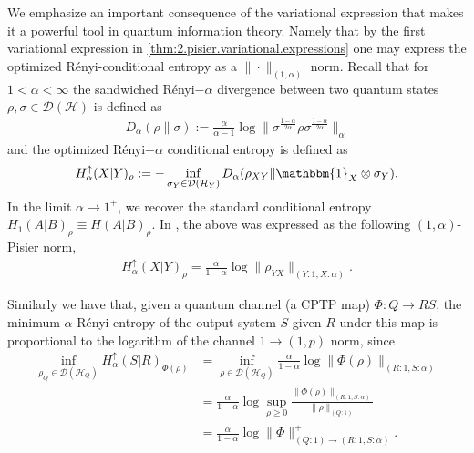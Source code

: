 \documentclass[11pt]{article}
\newcommand{\1}{\ensuremath{\mathbbm{1}}}
\theoremstyle{newdefinition}
\theoremstyle{newplain}
\theoremstyle{myplain}
\begin{document}
We emphasize an important consequence of the variational expression that makes it a powerful tool in quantum information theory. Namely that by the first variational expression in \cref{thm:2.pisier.variational.expressions} one may express the  optimized R\'{e}nyi-conditional entropy as a $\|\cdot\|_{(1,\alpha)}$ norm.  %
Recall that for $1< \alpha<\infty$ the sandwiched R\'{e}nyi$-\alpha$ divergence \cite{Lennert.2013, Wilde.2014} between two quantum states $\rho,\sigma\in\mathcal{D}(\mathcal{H})$ is defined as
\begin{align}
    D_\alpha(\rho\|\sigma):= \frac{\alpha}{\alpha-1}\log\|\sigma^{\frac{1-\alpha}{2\alpha}}\rho\sigma^{\frac{1-\alpha}{2\alpha}}\|_\alpha
\end{align}
and the optimized R\'{e}nyi$-\alpha$ conditional entropy is defined as
\begin{align}
    H^\uparrow_\alpha(X|Y)_\rho := -\inf_{\sigma_Y\in \mathcal{D}(\mathcal{H}_Y)}D_{\alpha}(\rho_{XY}\|\1_X\otimes\sigma_Y). 
\end{align} 
In the limit $\alpha\to 1^+$, we recover the standard conditional entropy $H_1(A|B)_\rho\equiv H(A|B)_\rho$. In \cite{Devetak.2006}, the above was expressed as the following $(1,\alpha)$-Pisier norm,
\begin{align}
   H^\uparrow_\alpha(X|Y)_\rho = \frac{\alpha}{1-\alpha}\log\|\rho_{YX}\|_{(Y:1,X:\alpha)}.
\end{align} 

Similarly we have that, given a quantum channel (a CPTP map) $\Phi:Q\to RS$, the minimum $\alpha$-R\'{e}nyi-entropy of the output system $S$ given $R$ under this map is proportional to the logarithm of the channel $1\to(1,p)$ norm, since
\begin{align}
    \inf_{\rho_{Q}\in\mathcal{D}(\mathcal{H}_{Q})}H_\alpha^\uparrow(S|R)_{\Phi(\rho)} &= \inf_{\rho\in\mathcal{D}(\mathcal{H}_{Q})}\frac{\alpha}{1-\alpha}\log\|\Phi(\rho)\|_{(R:1,S:\alpha)} \\ &= \frac{\alpha}{1-\alpha}\log \sup_{\rho \geq 0} \frac{\|\Phi(\rho)\|_{(R:1,S:\alpha)}}{\| \rho \|_{(Q:1)}}  \\ &= \frac{\alpha}{1-\alpha}\log\|\Phi\|^+_{(Q:1)\to(R:1,S:\alpha)}.
    \label{eq:operator_norm_min_entropy}
\end{align}
\end{document}
